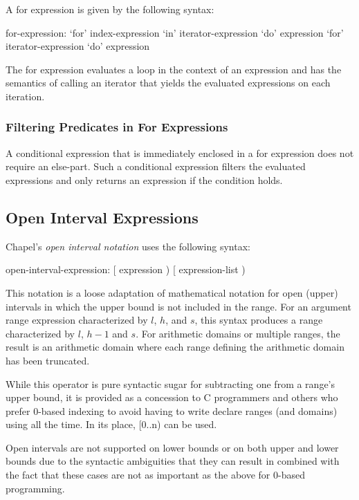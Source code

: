 A for expression is given by the following syntax:
\begin{syntax}
for-expression:
  `for' index-expression `in' iterator-expression `do' expression
  `for' iterator-expression `do' expression
\end{syntax}
The for expression evaluates a loop in the context of an expression
and has the semantics of calling an iterator that yields the evaluated
expressions on each iteration.

\subsubsection{Filtering Predicates in For Expressions}
\label{Filtering_Predicates_For}

A conditional expression that is immediately enclosed in a for
expression does not require an else-part.  Such a conditional
expression filters the evaluated expressions and only returns an
expression if the condition holds.

\subsection{Open Interval Expressions}
\label{Open_Interval}


Chapel's \emph{open interval notation} uses the following syntax:
\begin{syntax}
open-interval-expression:
  [ expression )
  [ expression-list )
\end{syntax}

This notation is a loose adaptation of mathematical notation for open
(upper) intervals in which the upper bound is not included in the
range.  For an argument range expression characterized by $l$, $h$,
and $s$, this syntax produces a range characterized by $l$, $h-1$ and
$s$.  For arithmetic domains or multiple ranges, the result is an
arithmetic domain where each range defining the arithmetic domain has
been truncated.

\begin{rationale}
While this operator is pure syntactic sugar for subtracting one from a
range's upper bound, it is provided as a concession to C programmers
and others who prefer 0-based indexing to avoid having to write
declare ranges (and domains) using  all the time.  In its
place, [0..n) can be used.

Open intervals are not supported on lower bounds or on both upper and
lower bounds due to the syntactic ambiguities that they can result in
combined with the fact that these cases are not as important as the
above for 0-based programming.
\end{rationale}

